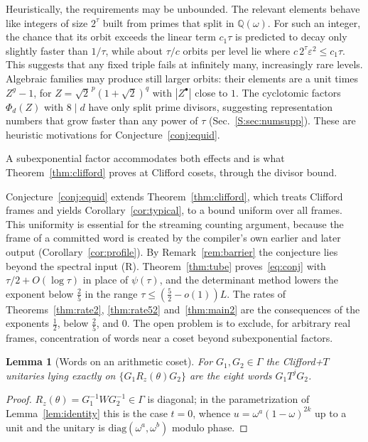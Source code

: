 \documentclass[aps,prx,twocolumn,superscriptaddress,nofootinbib,longbibliography]{revtex4-2}
\theoremstyle{plain}
\newtheorem{lemma}{Lemma}
\theoremstyle{definition}
\theoremstyle{remark}
\newcommand{\Q}{\mathbb{Q}}
\begin{document}
Heuristically, the requirements may be unbounded. The relevant elements behave like integers of size $2^\tau$ built from primes that split in $\Q(\omega)$. For such an integer, the chance that its orbit exceeds the linear term $c_1\tau$ is predicted to decay only slightly faster than $1/\tau$, while about $\tau/c$ orbits per level lie where $c\,2^\tau\varepsilon^2\le c_1\tau$. This suggests that any fixed triple fails at infinitely many, increasingly rare levels. Algebraic families may produce still larger orbits: their elements are a unit times $Z^g-1$, for $Z=\sqrt2^{\,p}(1+\sqrt2)^q$ with $|Z^\bullet|$ close to $1$. The cyclotomic factors $\Phi_d(Z)$ with $8\mid d$ have only split prime divisors, suggesting representation numbers that grow faster than any power of $\tau$ (Sec.~\ref{S:sec:numsupp}). These are heuristic motivations for Conjecture~\ref{conj:equid}.

A subexponential factor accommodates both effects and is what Theorem~\ref{thm:clifford} proves at Clifford cosets, through the divisor bound.

Conjecture~\ref{conj:equid} extends Theorem~\ref{thm:clifford}, which treats Clifford frames and yields Corollary~\ref{cor:typical}, to a bound uniform over all frames. This uniformity is essential for the streaming counting argument, because the frame of a committed word is created by the compiler's own earlier and later output (Corollary~\ref{cor:profile}). By Remark~\ref{rem:barrier} the conjecture lies beyond the spectral input (R). Theorem~\ref{thm:tube} proves~\eqref{eq:conj} with $\tau/2+O(\log\tau)$ in place of $\psi(\tau)$, and the determinant method lowers the exponent below $\tfrac25$ in the range $\tau\le(\tfrac52-o(1))L$. The rates of Theorems~\ref{thm:rate2}, \ref{thm:rate52} and~\ref{thm:main2} are the consequences of the exponents $\tfrac12$, below $\tfrac25$, and $0$. The open problem is to exclude, for arbitrary real frames, concentration of words near a coset beyond subexponential factors.

\begin{lemma}[Words on an arithmetic coset]\label{lem:arith}
For $G_1,G_2\in\Gamma$ the Clifford+$T$ unitaries lying exactly on $\{G_1R_z(\theta)G_2\}$ are the eight words $G_1T^jG_2$.
\end{lemma}
\begin{proof}
$R_z(\theta)=G_1^{-1}WG_2^{-1}\in\Gamma$ is diagonal; in the parametrization of Lemma~\ref{lem:identity} this is the case $t=0$, whence $u=\omega^a(1-\omega)^{2k}$ up to a unit and the unitary is $\mathrm{diag}(\omega^a,\omega^b)$ modulo phase.
\end{proof}
\end{document}

